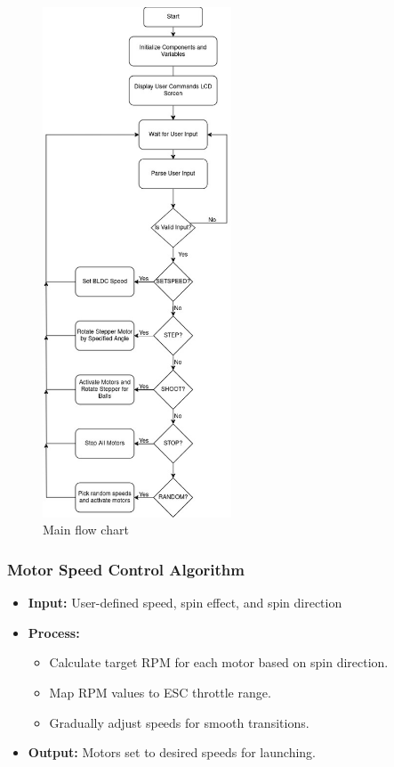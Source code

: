 \documentclass[12pt]{article}
\begin{document}
\begin{figure}[H]
    \centering
    \includegraphics[width=0.5\textwidth]{CH5 figureler/salih figureler/main flow chart.jpg}
    \caption{Main flow chart}
    \label{fig:main flow chart}
\end{figure}

\subsubsection{Motor Speed Control Algorithm}
\begin{itemize}
    \item \textbf{Input:}  User-defined speed, spin effect, and spin direction
    \item  \textbf{Process:}
    \begin{itemize}
        \item Calculate target RPM for each motor based on spin direction.
        \item Map RPM values to ESC throttle range.
        \item Gradually adjust speeds for smooth transitions.
    \end{itemize}
    \item \textbf{Output:} Motors set to desired speeds for launching.
\end{itemize}
\end{document}
